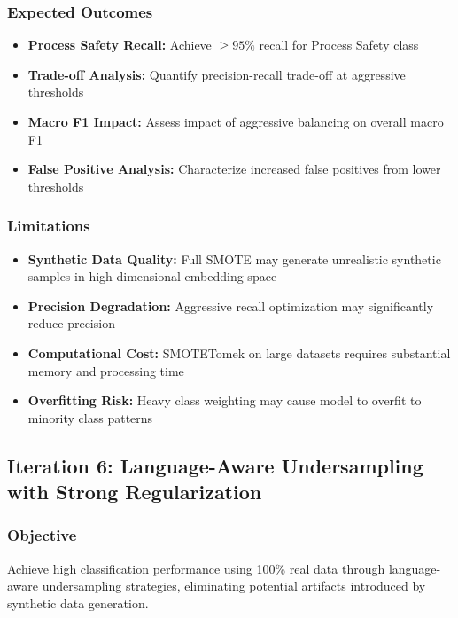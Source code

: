 \documentclass[11pt, titlepage, bibliography=totoc]{scrreprt}
\begin{document}
\subsubsection{Expected Outcomes}

\begin{itemize}
    \item \textbf{Process Safety Recall:} Achieve $\geq 95\%$ recall for Process Safety class
    \item \textbf{Trade-off Analysis:} Quantify precision-recall trade-off at aggressive thresholds
    \item \textbf{Macro F1 Impact:} Assess impact of aggressive balancing on overall macro F1
    \item \textbf{False Positive Analysis:} Characterize increased false positives from lower thresholds
\end{itemize}

\subsubsection{Limitations}

\begin{itemize}
    \item \textbf{Synthetic Data Quality:} Full SMOTE may generate unrealistic synthetic samples in high-dimensional embedding space
    \item \textbf{Precision Degradation:} Aggressive recall optimization may significantly reduce precision
    \item \textbf{Computational Cost:} SMOTETomek on large datasets requires substantial memory and processing time
    \item \textbf{Overfitting Risk:} Heavy class weighting may cause model to overfit to minority class patterns
\end{itemize}

\subsection{Iteration 6: Language-Aware Undersampling with Strong Regularization}

\subsubsection{Objective}
Achieve high classification performance using 100\% real data through language-aware undersampling strategies, eliminating potential artifacts introduced by synthetic data generation.
\end{document}
